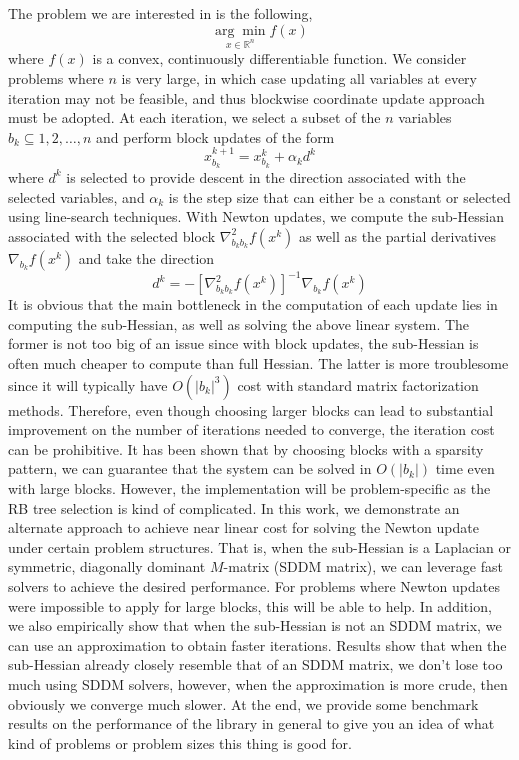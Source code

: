 \documentclass[11pt]{article}
\theoremstyle{definition}
\theoremstyle{definition}
\newcommand{\R}{\mathbb{R}}%
\newcommand{\bhessf}[2]{\nabla^2_{#2} f(#1)}
\newcommand{\bgradf}[2]{\nabla_{#2} f(#1)}
\begin{document}
The problem we are interested in is the following,
\begin{equation}
\underset{x\in\R^n}{\arg\min}f(x)
\end{equation}
where $f(x)$ is a convex, continuously differentiable function. We consider problems where $n$ is very large, in which case updating all variables at every iteration may not be feasible, and thus blockwise coordinate update approach must be adopted. At each iteration, we select a subset of the $n$ variables $b_k\subseteq{1,2,\dots,n}$ and perform block updates of the form
\begin{equation}
x_{b_k}^{k+1}=x^k_{b_k}+\alpha_kd^k
\end{equation}
where $d^k$ is selected to provide descent in the direction associated with the selected variables, and $\alpha_k$ is the step size that can either be a constant or selected using line-search techniques. With Newton updates, we compute the sub-Hessian associated with the selected block $\bhessf{x^k}{b_kb_k}$ as well as the partial derivatives $\bgradf{x^k}{b_k}$ and take the direction
\begin{equation}
d^k=-[\bhessf{x^k}{b_kb_k}]^{-1}\bgradf{x^k}{b_k}
\end{equation}
It is obvious that the main bottleneck in the computation of each update lies in computing the sub-Hessian, as well as solving the above linear system. The former is not too big of an issue since with block updates, the sub-Hessian is often much cheaper to compute than full Hessian. The latter is more troublesome since it will typically have $O(|b_k|^3)$ cost with standard matrix factorization methods. Therefore, even though choosing larger blocks can lead to substantial improvement on the number of iterations needed to converge, the iteration cost can be prohibitive. It has been shown that by choosing blocks with a  sparsity pattern, we can guarantee that the system can be solved in $O(|b_k|)$ time even with large blocks.  However, the implementation will be problem-specific as the RB tree selection is kind of complicated. In this work, we demonstrate an alternate approach to achieve near linear cost for solving the Newton update under certain problem structures. That is, when the sub-Hessian is a Laplacian or symmetric, diagonally dominant $M$-matrix (SDDM matrix), we can leverage fast solvers to achieve the desired performance. For problems where Newton updates were impossible to apply for large blocks, this will be able to help. In addition, we also empirically show that when the sub-Hessian is not an SDDM matrix, we can use an approximation to obtain faster iterations. Results show that when the sub-Hessian already closely resemble that of an SDDM matrix, we don't lose too much using SDDM solvers, however, when the approximation is more crude, then obviously we converge much slower. At the end, we provide some benchmark results on the performance of the library in general to give you an idea of what kind of problems or problem sizes this thing is good for.
\end{document}
